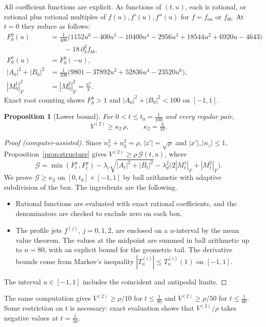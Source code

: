 \documentclass[11pt]{amsart}
\newtheorem{proposition}[theorem]{Proposition}
\theoremstyle{definition}
\theoremstyle{remark}
\begin{document}
All coefficient functions are explicit. As functions of $(t,u)$, each is rational, or rational plus rational multiples of $f(u),f'(u),f''(u)$ for $f=f_{aa}$ or $f_{bb}$. At $t=0$ they reduce as follows:
\begin{align*}
F^y_0(u)&=\tfrac1{400}\big(1152u^6-400u^5-10400u^4-2956u^3+18544u^2+6920u-4643\big)\\
&\qquad-18\,\partial_\delta^2f_{bb},\\
F^x_0(u)&=F^y_0(-u),\\
|A_0|^2+|B_0|^2&=\tfrac1{100}\big(9801-37892u^2+52836u^4-23520u^6\big),\\
|M^1_0|_F^2&=|M^2_0|_F^2=\tfrac{u^2}8 .
\end{align*}
Exact root counting shows $F^y_0>1$ and $|A_0|^2+|B_0|^2<100$ on $[-1,1]$.

\begin{proposition}[Lower bound]\label{prop:bound}
For $0<t\le t_0=\frac1{100}$ and every regular pair,
\[ V^{(2)}\ge\kappa_2\,\rho,\qquad\kappa_2=\tfrac3{10}. \]
\end{proposition}

\begin{proof}[Proof (computer-assisted)]
Since $n_x^2+n_y^2=\rho$, $|z'|=\sqrt\rho$ and $|x'|,|n_z|\le1$, Proposition~\ref{prop:structure} gives $V^{(2)}\ge\rho\,\mathcal G(t,u)$, where
\[ \mathcal G=\min(F^x_t,F^y_t)-\lambda_c\sqrt{|A_t|^2+|B_t|^2}-\lambda_d^2\big(2|M^1_t|_F+|M^2_t|_F\big). \]
We prove $\mathcal G\ge\kappa_2$ on $[0,t_0]\times[-1,1]$ by ball arithmetic with adaptive subdivision of the box. The ingredients are the following.
\begin{itemize}[leftmargin=*]
\item Rational functions are evaluated with exact rational coefficients, and the denominators are checked to exclude zero on each box.
\item The profile jets $f^{(j)}$, $j=0,1,2$, are enclosed on a $u$-interval by the mean value theorem. The values at the midpoint are summed in ball arithmetic up to $n=80$, with an explicit bound for the geometric tail. The derivative bounds come from Markov's inequality $|T_n^{(i)}|\le T_n^{(i)}(1)$ on $[-1,1]$.
\end{itemize}
The interval $u\in[-1,1]$ includes the coincident and antipodal limits.
\end{proof}

The same computation gives $V^{(2)}\ge\rho/10$ for $t\le\frac1{80}$ and $V^{(2)}\ge\rho/50$ for $t\le\frac1{60}$. Some restriction on $t$ is necessary: exact evaluation shows that $V^{(2)}/\rho$ takes negative values at $t=\frac1{50}$.
\end{document}
